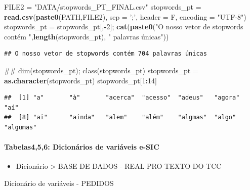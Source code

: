 \documentclass[]{article}
\newenvironment{Shaded}{\begin{snugshade}}{\end{snugshade}}
\newcommand{\KeywordTok}[1]{\textcolor[rgb]{0.13,0.29,0.53}{\textbf{#1}}}
\newcommand{\DataTypeTok}[1]{\textcolor[rgb]{0.13,0.29,0.53}{#1}}
\newcommand{\DecValTok}[1]{\textcolor[rgb]{0.00,0.00,0.81}{#1}}
\newcommand{\StringTok}[1]{\textcolor[rgb]{0.31,0.60,0.02}{#1}}
\newcommand{\OperatorTok}[1]{\textcolor[rgb]{0.81,0.36,0.00}{\textbf{#1}}}
\newcommand{\NormalTok}[1]{#1}
\providecommand{\tightlist}{%
  \setlength{\itemsep}{0pt}\setlength{\parskip}{0pt}}
\let\oldparagraph\paragraph
\renewcommand{\paragraph}[1]{\oldparagraph{#1}\mbox{}}
\begin{document}
\begin{Shaded}
\begin{Highlighting}[]
\NormalTok{FILE2 =}\StringTok{ "DATA/stopwords_PT_FINAL.csv"}
\NormalTok{stopwords_pt =}\StringTok{ }\KeywordTok{read.csv}\NormalTok{(}\KeywordTok{paste0}\NormalTok{(PATH,FILE2), }\DataTypeTok{sep =} \StringTok{';'}\NormalTok{, }\DataTypeTok{header =}\NormalTok{ F, }\DataTypeTok{encoding =} \StringTok{"UTF-8"}\NormalTok{)}
\NormalTok{stopwords_pt =}\StringTok{ }\NormalTok{stopwords_pt[,}\OperatorTok{-}\DecValTok{2}\NormalTok{]; }
\KeywordTok{cat}\NormalTok{(}\KeywordTok{paste0}\NormalTok{(}\StringTok{"O nosso vetor de stopwords contém "}\NormalTok{,}\KeywordTok{length}\NormalTok{(stopwords_pt), }\StringTok{" palavras únicas"}\NormalTok{))}
\end{Highlighting}
\end{Shaded}

\begin{verbatim}
## O nosso vetor de stopwords contém 704 palavras únicas
\end{verbatim}

\begin{Shaded}
\begin{Highlighting}[]
\NormalTok{## dim(stopwords_pt); class(stopwords_pt)}
\NormalTok{stopwords_pt =}\StringTok{ }\KeywordTok{as.character}\NormalTok{(stopwords_pt)}
\NormalTok{stopwords_pt[}\DecValTok{1}\OperatorTok{:}\DecValTok{14}\NormalTok{]}
\end{Highlighting}
\end{Shaded}

\begin{verbatim}
##  [1] "a"       "à"       "acerca"  "acesso"  "adeus"   "agora"   "aí"     
##  [8] "ai"      "ainda"   "alem"    "além"    "algmas"  "algo"    "algumas"
\end{verbatim}

\paragraph{Tabelas4,5,6: Dicionários de variáveis
e-SIC}\label{tabelas456-dicionarios-de-variaveis-e-sic}

\begin{itemize}
\tightlist
\item
  Dicionário \textgreater{} BASE DE DADOS - REAL PRO TEXTO DO TCC
\end{itemize}

Dicionário de variáveis - PEDIDOS
\end{document}

